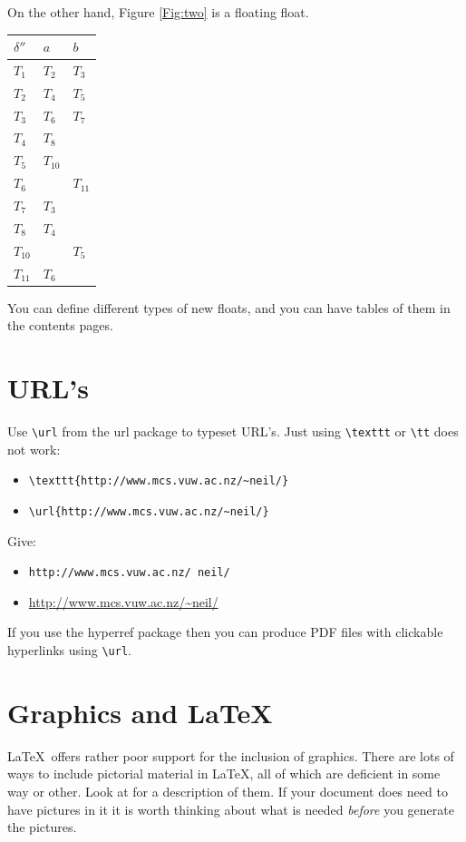 On the other hand, Figure \ref{Fig:two} is a floating float. 



\begin{fig}[tbh]
\begin{center}
\begin{tabular}{l|ll}
$\delta''$ & $\mathit{a}$ & $\mathit{b}$ \\ \hline 
$T_{1}$  & $T_{2}$ & $T_{3}$\\ 
$T_{2}$  & $T_{4}$ & $T_{5}$\\ 
$T_{3}$  & $T_{6}$ & $T_{7}$\\ 
$T_{4}$  & $T_{8}$ & \\
$T_{5}$  & $T_{10}$ & \\
$T_{6}$  &  & $T_{11}$\\ 
$T_{7}$  & $T_{3}$ & \\
$T_{8}$  & $T_{4}$ & \\
$T_{10}$  &  & $T_{5}$\\ 
$T_{11}$  & $T_{6}$ & 
\end{tabular}
\caption{The transition function of an FA to accept 
the same language.}
\label{Fig:two}
\end{center}
\end{fig}

You can define different types of new floats, and you can have tables 
of them in the contents pages.


\section{URL's}
Use \verb=\url= from the \textsf{url} package to typeset URL's. Just 
using \verb+\texttt+ or \verb+\tt+ does not work:

\begin{itemize}
\item \verb+\texttt{http://www.mcs.vuw.ac.nz/~neil/}+
\item \verb+\url{http://www.mcs.vuw.ac.nz/~neil/}+
\end{itemize}

Give:
\begin{itemize}
\item \texttt{http://www.mcs.vuw.ac.nz/~neil/}
\item \url{http://www.mcs.vuw.ac.nz/~neil/}
\end{itemize}
If you use the \textsf{hyperref} package then you can produce PDF 
files with clickable hyperlinks using \verb=\url=.

\section{Graphics and \LaTeX}
\LaTeX\ offers rather poor support for the inclusion of graphics. 
There are lots of ways to include pictorial material in \LaTeX, all 
of which are deficient in some way or other. Look at \cite{GRM97GC} for a 
description of them. If your document does need to have pictures in it 
it is worth thinking about what is needed \emph{before} you generate 
the pictures. \cite{santosMLRPLMachineLearningBased2023}


